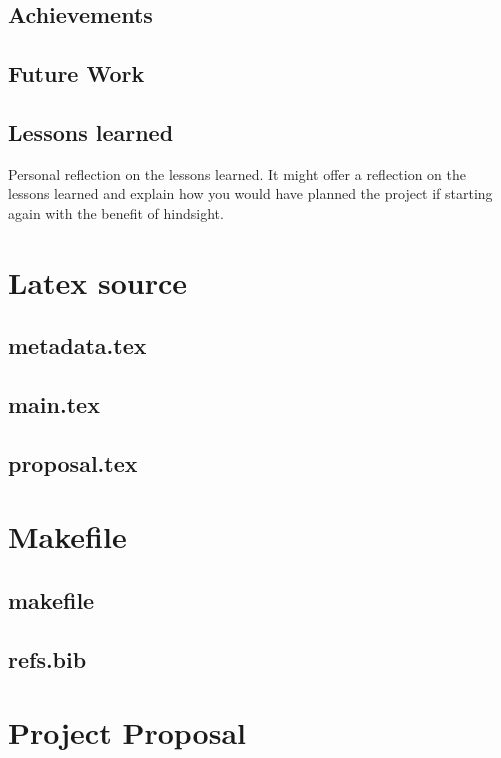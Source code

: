 \documentclass[12pt,a4paper,twoside,openright]{report}
\begin{document}
\section{Achievements}

\section{Future Work}

\section{Lessons learned}
Personal reflection on the lessons learned.
It might offer a reflection on the lessons learned and explain how you would have planned the project if starting again with the benefit of hindsight.





\appendix

\chapter{Latex source}

\section{metadata.tex}
{\scriptsize}

\section{main.tex}
{\scriptsize}

\section{proposal.tex}
{\scriptsize}

\chapter{Makefile}

\section{makefile}\label{makefile}
{\scriptsize}

\section{refs.bib}
{\scriptsize}


\chapter{Project Proposal}


\end{document}
